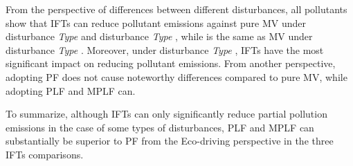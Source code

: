\documentclass[journal]{IEEEtran}
\begin{document}
From the perspective of differences between different disturbances, all pollutants show that IFTs can reduce pollutant emissions against pure MV under disturbance \textit{Type \uppercase\expandafter{}} and disturbance \textit{Type \uppercase\expandafter{}}, while is the same as MV under disturbance \textit{Type \uppercase\expandafter{}}. Moreover, under disturbance \textit{Type \uppercase\expandafter{}}, IFTs have the most significant impact on reducing pollutant emissions. From another perspective, adopting PF does not cause noteworthy differences compared to pure MV, while adopting PLF and MPLF can. 

To summarize, although IFTs can only significantly reduce partial pollution emissions in the case of some types of disturbances, PLF and MPLF can substantially be superior to PF from the Eco-driving perspective in the three IFTs comparisons.

\end{document}
